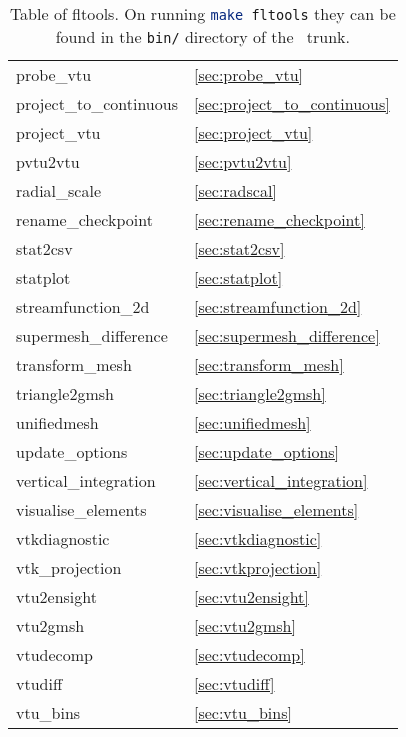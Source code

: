 \begin{table}
\begin{center}
\begin{tabular}{| l | l |}
	probe\_vtu  				& \ref{sec:probe_vtu} 			\\
	project\_to\_continuous			& \ref{sec:project_to_continuous} 	\\
	project\_vtu				& \ref{sec:project_vtu} 		\\
	pvtu2vtu				& \ref{sec:pvtu2vtu}			\\
  radial\_scale                           & \ref{sec:radscal}                     \\
	rename\_checkpoint			& \ref{sec:rename_checkpoint}		\\
	stat2csv				& \ref{sec:stat2csv}			\\
	statplot				& \ref{sec:statplot} 			\\
	streamfunction\_2d			& \ref{sec:streamfunction_2d} 		\\
	supermesh\_difference			& \ref{sec:supermesh_difference} 	\\
	transform\_mesh				& \ref{sec:transform_mesh}		\\
	triangle2gmsh				& \ref{sec:triangle2gmsh}		\\
	unifiedmesh				& \ref{sec:unifiedmesh} 		\\
	update\_options				& \ref{sec:update_options}		\\
	vertical\_integration			& \ref{sec:vertical_integration} 	\\
  visualise\_elements     & \ref{sec:visualise_elements} \\
	vtkdiagnostic				& \ref{sec:vtkdiagnostic}		\\
	vtk\_projection				& \ref{sec:vtkprojection}		\\
  vtu2ensight & \ref{sec:vtu2ensight} \\
	vtu2gmsh & \ref{sec:vtu2gmsh} \\
	vtudecomp				& \ref{sec:vtudecomp}			\\
	vtudiff					& \ref{sec:vtudiff}			\\
	vtu\_bins           			& \ref{sec:vtu_bins}			\\
    \hline
  \end{tabular}
\end{center}
\caption[Table of fltools]{Table of fltools. On running \lstinline[language = bash]+make fltools+ they can be found in the \lstinline[language = bash]+bin/+ directory of the \fluidity\ trunk.}
\label{tab:fltools}
\end{table}


